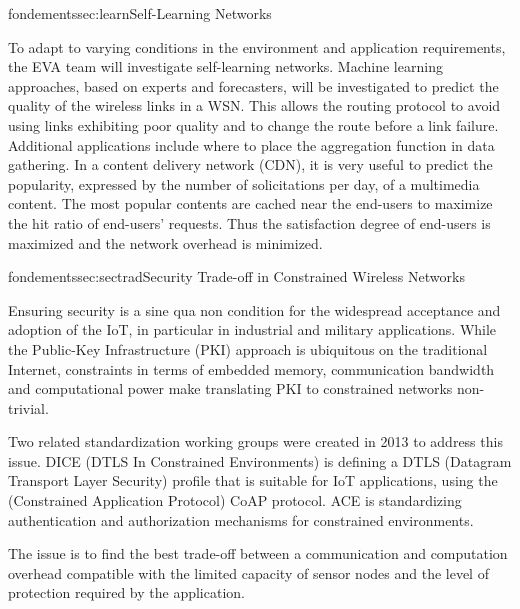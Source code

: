 \documentclass{ra2016}
\begin{document}
\begin{module}{fondements}{sec:learn}{Self-Learning Networks}

To adapt to varying conditions in the environment and application requirements, the EVA team will investigate self-learning networks.
Machine learning approaches, based on experts and forecasters, will be investigated to predict the quality of the wireless links in a WSN.
This allows the routing protocol to avoid using links exhibiting poor quality and to change the route before a link failure.
Additional applications include where to place the aggregation function in data gathering.
In a content delivery network (CDN), it is very useful to predict the popularity, expressed by the number of solicitations per day, of a multimedia content.
The most popular contents are cached near the end-users to maximize the hit ratio of end-users' requests.
Thus the satisfaction degree of end-users is maximized and the network overhead is minimized. 

\end{module}

\begin{module}{fondements}{sec:sectrad}{Security Trade-off in Constrained Wireless Networks}

Ensuring security is a {sine qua non} condition for the widespread acceptance and adoption of the IoT, in particular in industrial and military applications.
While the Public-Key Infrastructure (PKI) approach is ubiquitous on the traditional Internet, constraints in terms of embedded memory, communication bandwidth and computational power make translating PKI to constrained networks non-trivial.

Two related standardization working groups were created in 2013 to address this issue.
DICE (DTLS In Constrained Environments) is defining a DTLS (Datagram Transport Layer Security) profile that is suitable for IoT applications, using the (Constrained Application Protocol) CoAP protocol.
ACE is standardizing authentication and authorization mechanisms for constrained environments.

The issue is to find the best trade-off between a communication and computation overhead compatible with the limited capacity of sensor nodes and the level of protection required by the application.

\end{module}
\end{document}
